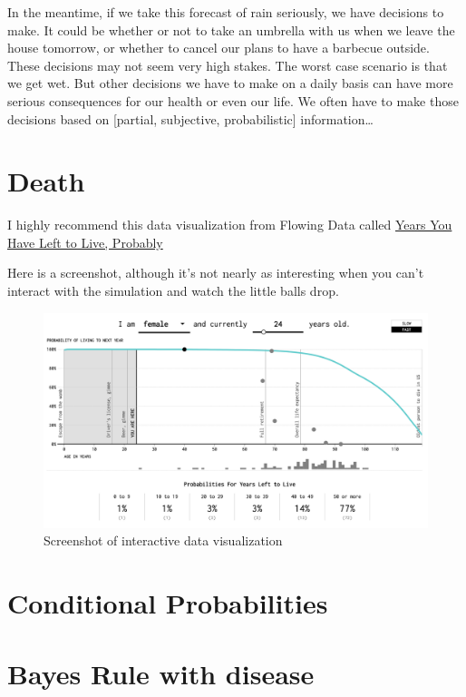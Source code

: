 \documentclass[]{book}
\begin{document}
In the meantime, if we take this forecast of rain seriously, we have decisions to make. It could be whether or not to take an umbrella with us when we leave the house tomorrow, or whether to cancel our plans to have a barbecue outside. These decisions may not seem very high stakes. The worst case scenario is that we get wet. But other decisions we have to make on a daily basis can have more serious consequences for our health or even our life. We often have to make those decisions based on {[}partial, subjective, probabilistic{]} information\ldots{}

\hypertarget{death}{%
\section{Death}\label{death}}

I highly recommend this data visualization from Flowing Data called \href{https://flowingdata.com/2015/09/23/years-you-have-left-to-live-probably/}{Years You Have Left to Live, Probably}

Here is a screenshot, although it's not nearly as interesting when you can't interact with the simulation and watch the little balls drop.

\begin{figure}
\includegraphics[width=0.9\linewidth]{images/YYHLTLScreenshot1} \caption{Screenshot of interactive data visualization}\label{fig:years-screen}
\end{figure}

\hypertarget{conditional-probabilities}{%
\section{Conditional Probabilities}\label{conditional-probabilities}}

\hypertarget{bayes-rule-with-disease}{%
\section{Bayes Rule with disease}\label{bayes-rule-with-disease}}
\end{document}
